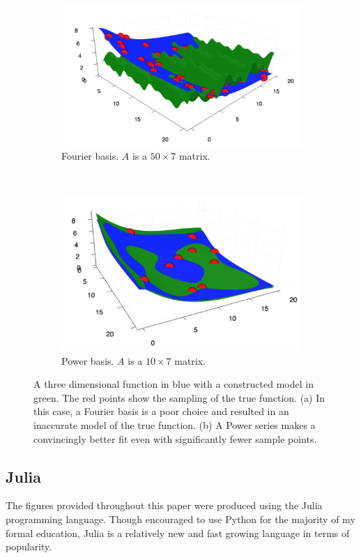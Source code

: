 \begin{figure}
  \begin{subfigure}{0.35\textwidth}
    \includegraphics[width=\linewidth]{Figures/3dFourier}
    \caption{Fourier basis. $A$ is a $50\times7$ matrix.} 
    \label{3dFourier}
  \end{subfigure}%
  \\
  \begin{subfigure}{0.35\textwidth}
    \includegraphics[width=\linewidth]{Figures/3dPower}
    \caption{Power basis. $A$ is a $10\times7$ matrix.} 
    \label{3dPower}
  \end{subfigure}%
\caption{A three dimensional function in blue with a constructed model in green. The red points show the sampling of the true function. (a) In this case, a Fourier basis is a poor choice and resulted in an inaccurate model of the true function. (b) A Power series makes a convincingly better fit even with significantly fewer sample points.} \label{3dFit}
\end{figure}


\subsection{Julia}\label{Sect:julia}
The figures provided throughout this paper were produced using the Julia programming language. Though encouraged to use Python for the majority of my formal education, Julia is a relatively new and fast growing language in terms of popularity. 
